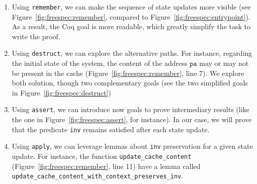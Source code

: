 \begin{enumerate}
\item Using \texttt{remember}, we can make the sequence of state updates more
  visible (see Figure~\ref{fig:freespec:remember}, compared to
  Figure~\ref{fig:freespec:entrypoint}).
  As a result, the Coq goal is more readable, which greatly simplify the task to
  write the proof.
\item Using \texttt{destruct}, we can explore the alternative paths.
  For instance, regarding the initial state of the system, the content of the
  address \( \mathtt{pa} \) may or may not be present in the cache
  (Figure~\ref{fig:freespec:remember}, line 7).
  We explore both solution, though two complementary goals (see the two
  simplified goals in Figure~\ref{fig:freespec:destruct})
\item Using \texttt{assert}, we can introduce now goals to prove intermediary
  results (like the one in Figure~\ref{fig:freespec:assert}, for instance).
  In our case, we will prove that the predicate \texttt{inv} remains satisfied
  after each state update.
\item Using \texttt{apply}, we can leverage lemmas about \texttt{inv}
  preservation for a given state update.
  For instance, the function \texttt{update\_cache\_content}
  (Figure~\ref{fig:freespec:remember}, line 11) have a lemma called
  \texttt{update\_cache\_content\_with\_context\_preserves\_inv}.
\end{enumerate}

